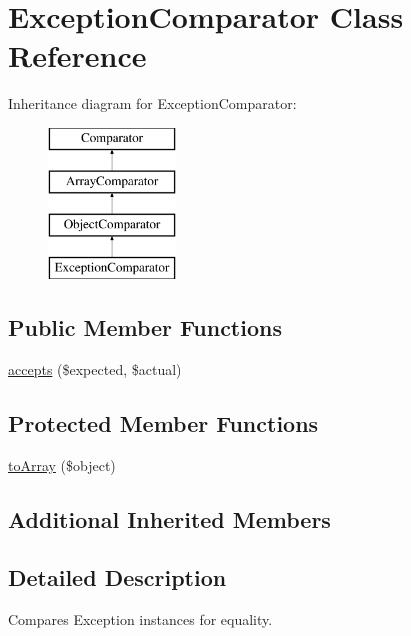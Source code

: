 \hypertarget{class_sebastian_bergmann_1_1_comparator_1_1_exception_comparator}{}\section{Exception\+Comparator Class Reference}
\label{class_sebastian_bergmann_1_1_comparator_1_1_exception_comparator}
Inheritance diagram for Exception\+Comparator\+:\begin{figure}[H]
\begin{center}
\leavevmode
\includegraphics[height=4.000000cm]{class_sebastian_bergmann_1_1_comparator_1_1_exception_comparator}
\end{center}
\end{figure}
\subsection*{Public Member Functions}
\begin{DoxyCompactItemize}
\item 
\mbox{\hyperlink{class_sebastian_bergmann_1_1_comparator_1_1_exception_comparator_ae9bdf0cba02ce3470169280656cdeb84}{accepts}} (\$expected, \$actual)
\end{DoxyCompactItemize}
\subsection*{Protected Member Functions}
\begin{DoxyCompactItemize}
\item 
\mbox{\hyperlink{class_sebastian_bergmann_1_1_comparator_1_1_exception_comparator_afd1cb3de15bd99be95ad5c707a97c493}{to\+Array}} (\$object)
\end{DoxyCompactItemize}
\subsection*{Additional Inherited Members}


\subsection{Detailed Description}
Compares Exception instances for equality. 

